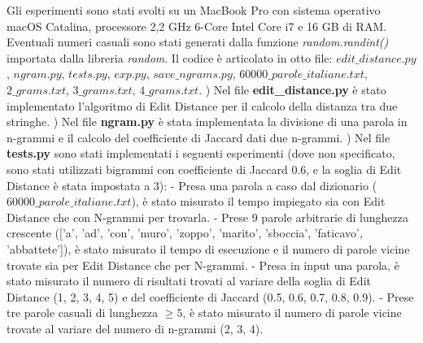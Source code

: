 \documentclass[a4paper,12pt]{article}
\begin{document}
Gli esperimenti sono stati svolti su un MacBook Pro con sistema operativo macOS Catalina, processore 2,2 GHz 6-Core Intel Core i7 e 16 GB di RAM.
\newline
\newline
Eventuali numeri casuali sono stati generati dalla funzione \textit{random.randint()} importata dalla libreria \textit{random}.
\newline
\newline
Il codice è articolato in otto file: $edit\_distance.py$, $ngram.py$, $tests.py$, $exp.py$, $save\_ngrams.py$, $60000\_parole\_italiane.txt$, $2\_grams.txt$, $3\_grams.txt$, $4\_grams.txt$.
\newline
{}) Nel file \textbf{edit\_distance.py} è stato implementato l'algoritmo di Edit Distance per il calcolo della distanza tra due stringhe.
\newline
{}) Nel file \textbf{ngram.py} è stata implementata la divisione di una parola in n-grammi e il calcolo del coefficiente di Jaccard dati due n-grammi.
\newline
{}) Nel file \textbf{tests.py} sono stati implementati i seguenti esperimenti (dove non specificato, sono stati utilizzati bigrammi con coefficiente di Jaccard 0.6, e la soglia di Edit Distance è stata impostata a 3):
\newline
\newline
- Presa una parola a caso dal dizionario ($60000\_parole\_italiane.txt$), è stato misurato il tempo impiegato sia con Edit Distance che con N-grammi per trovarla.
\newline
\newline
- Prese 9 parole arbitrarie di lunghezza crescente (['a', 'ad', 'con', 'muro', 'zoppo', 'marito', 'sboccia', 'faticavo', 'abbattete']), è stato misurato il tempo di esecuzione e il numero di parole vicine trovate sia per Edit Distance che per N-grammi.
\newline
\newline
- Presa in input una parola, è stato misurato il numero di risultati trovati al variare della soglia di Edit Distance (1, 2, 3, 4, 5) e del coefficiente di Jaccard (0.5, 0.6, 0.7, 0.8, 0.9).
\newline
\newline
- Prese tre parole casuali di lunghezza $\geq 5$, è stato misurato il numero di parole vicine trovate al variare del numero di n-grammi (2, 3, 4).
\end{document}
